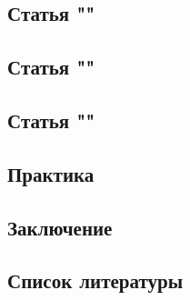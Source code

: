 \documentclass{article}
\begin{document}
    \newpage
    \begin{center} 
    \section{Статья ""}
    \end{center} 
    
    \newpage
    \begin{center} 
    \section{Статья ""}
    \end{center} 
    
    \newpage
    \begin{center} 
    \section{Статья ""}
    \end{center} 
    
    \newpage
    \begin{center} 
    \section{Практика}
    \end{center} 
    
    \newpage
    \begin{center} 
    \section{Заключение}
    \end{center} 
    
    \newpage
    \begin{center} 
    \section{Список литературы}
    \end{center} 
    
\end{document}
